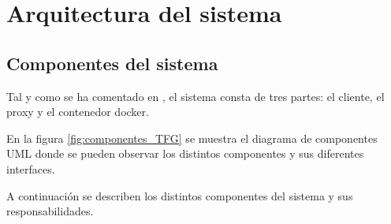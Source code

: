 \section{Arquitectura del sistema}\label{sec:arquitectura-sistema}

\subsection{Componentes del sistema} \label{sec:componentes-sistema}

Tal y como se ha comentado en , el sistema consta de tres partes: el cliente, el proxy y el contenedor docker.

En la figura \ref{fig:componentes_TFG} se muestra el diagrama de componentes UML \cite{Cook2017} donde se pueden observar los distintos componentes y sus diferentes interfaces.


A continuación se describen los distintos componentes del sistema y sus responsabilidades.

